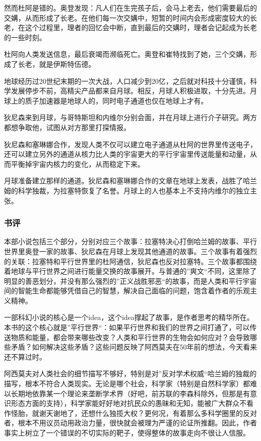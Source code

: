\begin{itemize*}
	\item 然而杜阿是错的。奥登发现：凡人们在生完孩子后，会马上老去，他们需要最后的交媾，从而形成了长老。在他们每一次交媾中，短暂的时间内会形成密度较大的长老，在这个过程里，理者的回忆会中断，直到最后的交媾时，理者会记起成为长老的一些时刻。
	\item 杜阿向人类发送信息，最后衰竭而濒临死亡。奥登和崔特找到了她，三个交媾，形成了长老，就是伊斯特伍德。
	\item 地球经历过20世纪末期的一次大战，人口减少到20亿，之后就对科技十分谨慎，科学发展停步不前，高精尖产品都来自月球。相反，月球人积极进取，十分先进。月球上的质子加速器是地球人的，同时电子通道也仅在地球上才有。
	\item 狄尼森来到月球，与哥特斯坦和内维尔分别会面，并在月球上进行介子研究。两方都想争取他，试图从对方那里打探情报。
	\item 狄尼森和塞琳娜合作，发现人类不仅可以建立电子通道从杜阿的世界里传送电子，还可以建立另外的通道从核力比人类的宇宙更大的平行宇宙里传送能量和动量，从而平衡掉宇宙内核力的变化，从而稳定下来。
	\item 月球准备建立那样的通道。狄尼森和塞琳娜合作的文章在地球上发表，战胜了哈兰姆的科学独裁，为拉塞特恢复了名誉。月球上的人也基本上不支持内维尔的独立主张。
\end{itemize*}

\subsubsection{书评}
本部小说包括三个部分，分别对应三个故事：拉塞特决心打倒哈兰姆的故事、平行世界里奥登一家的故事、狄尼森在月球上发现其他通道的故事。三个故事有着强烈的关联：拉塞特和平行世界里的杜阿通信，狄尼森也反对拉塞特。三个故事都围绕着地球与平行世界之间进行能量交换的故事展开。与普通的”爽文“不同，这里除了明显的善恶划分，并没有那么强烈的”正义战胜邪恶“的故事，而是人类和平行宇宙间的智能生命都能够凭借自己的智慧，解决自己面临的问题，饱含着作者的乐观主义精神。

一部科幻小说的核心是一个idea，这个idea撑起了故事，是作者思考的精华所在。本书的这个核心就是”平行世界“：如果平行世界和我们的世界之间打通了，可以传送物质和能量，都会带来哪些改变？人类和平行世界的生物会如何应对？会导致哪些矛盾？如何解决这些矛盾？这些问题反映了阿西莫夫在50年前的想法，今天看来还不算过时。

阿西莫夫对人类社会的细节描写不够好，特别是对”反对学术权威“哈兰姆的独裁的描写，根本不符合人类现实。无论是哪个社会，科学家（特别是自然科学家）都难以长期地依靠某一个理论来垄断学术界（好吧，前苏联的李森科除外，但那是有意识形态方面的支持），科学家能好好地对抗民众的愚昧和无知，能被广大群众不看作怪胎，就谢天谢地了，还想什么独揽大权？更何况，有着那么多科学圈里的反对者，根本不用议员动用政治力量，很快就会被理为严谨的论证所推翻。因此，作者事实上树立了一个错误的不切实际的靶子，使得整体的故事走向不很让人信服。

